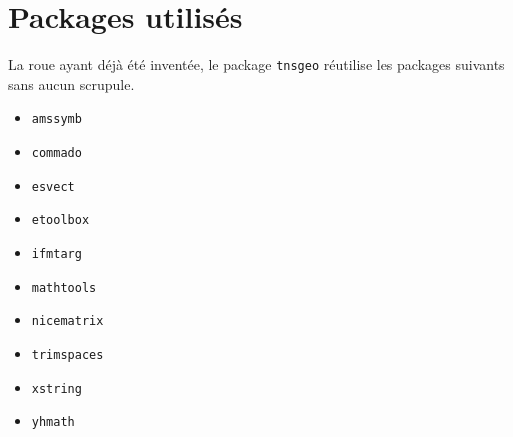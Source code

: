 \documentclass[12pt,a4paper]{article}
\begin{document}
\section{Packages utilisés}

La roue ayant déjà été inventée, le package \verb#tnsgeo# réutilise les packages suivants sans aucun scrupule.

\begin{multicols}{4}
    \begin{itemize}
        \item \verb#amssymb#
        \item \verb#commado#
        \item \verb#esvect#
        \item \verb#etoolbox#
        \item \verb#ifmtarg#
        \item \verb#mathtools#
        \item \verb#nicematrix#
        \item \verb#trimspaces#
        \item \verb#xstring#
        \item \verb#yhmath#
    \end{itemize}
\end{multicols}
\end{document}

